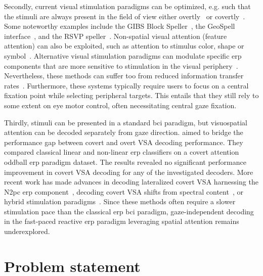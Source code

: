 Secondly, current visual stimulation paradigms can be optimized, e.g. such that
the stimuli are always present in the field of view either overtly~\cite{Acqualagna2013, Won2018,
Lin2018} or covertly~\cite{Treder2010,Pires2011,Lees2018}. Some noteworthy examples include the GIBS Block Speller~\parencite{Pires2011},
the GeoSpell interface~\parencite{Aloise2012}, and the RSVP
speller~\parencite{Acqualagna2011}.
Non-spatial visual attention (feature attention) can also be exploited, such as
attention to stimulus color, shape or symbol~\cite{Zhang2010,Treder2011,Hwang2015}.
Alternative visual stimulation paradigms can modulate specific \ac{erp} components
that are more sensitive to stimulation in the visual periphery~\cite{Schaeff2012,Xu2022}.
Nevertheless, these methods can suffer too from reduced information
transfer rates~\cite{Chennu2013}.
Furthermore, these systems typically require users to focus on a central fixation point while
selecting peripheral targets.
This entails that they still rely to some extent on
eye motor control, often necessitating central gaze fixation.

Thirdly, stimuli can be presented in a standard \ac{bci} paradigm, but visuospatial
attention can be decoded separately from gaze direction.
\textcite{Aloise2012} aimed to bridge the performance gap between covert and
overt VSA decoding performance.
They compared classical linear and non-linear \ac{erp} classifiers on a covert
attention oddball \ac{erp} paradigm dataset.
The results revealed no significant performance improvement in covert VSA
decoding for any of the investigated decoders.
More recent work has made advances in decoding lateralized covert
VSA harnessing the N2pc \ac{erp} component~\cite{Thiery2016,Reichert2020b,Wang2022},
decoding covert VSA shifts from spectral content~\cite{Tonin2013}, or hybrid
stimulation paradigms~\cite{Egan2017}.
Since these methods often require a slower stimulation pace than the classical
\ac{erp} \ac{bci} paradigm, gaze-independent decoding in the fast-paced reactive \ac{erp} paradigm
leveraging spatial attention remains underexplored.


\section{Problem statement}


